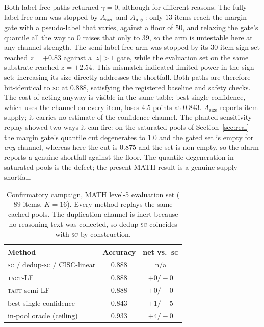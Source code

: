 \documentclass[conference]{IEEEtran}
\newcommand{\SC}{\textsc{sc}}
\newcommand{\TACT}{\textsc{tact}}
\begin{document}
Both label-free paths returned $\gamma=0$, although for different reasons. The fully label-free arm was stopped by
$A_{\mathrm{size}}$ and $A_{\mathrm{mgn}}$: only
$13$ items reach the margin gate with a pseudo-label that varies, against a
floor of $50$, and relaxing the gate's quantile all the way to $0$ raises
that only to $39$, so the arm is untestable here at any channel strength.
The semi-label-free arm was stopped by its $30$-item
sign set reached $z=+0.83$ against a $|z|>1$ gate, while the evaluation set on
the same substrate reached $z=+2.54$. This mismatch indicated limited power in
the sign set; increasing its size directly addresses the shortfall. Both paths are therefore
bit-identical to \SC{} at $0.888$, satisfying the registered baseline and
safety checks. The cost of acting anyway is
visible in the same table: best-single-confidence, which uses the channel on
every item, loses $4.5$ points at $0.843$.
$A_{\mathrm{size}}$ reports item supply; it carries no estimate of the
confidence channel. The planted-sensitivity replay showed two ways it can
fire: on the saturated pools of Section~\ref{sec:real} the
margin gate's quantile cut degenerates to $1.0$ and the gated set is empty for
\emph{any} channel, whereas here the cut is $0.875$ and the set is non-empty,
so the alarm reports a genuine shortfall against the floor. The quantile
degeneration in saturated pools is the defect; the present MATH result is a
genuine supply shortfall.

\begin{table}[t]
\caption{Confirmatory campaign, MATH level-5 evaluation set ($89$ items,
$K{=}16$). Every method replays the same cached pools. The duplication
channel is inert because no reasoning text was collected, so dedup-\SC{}
coincides with \SC{} by construction.}
\label{tab:hard}
\centering\footnotesize
\setlength{\tabcolsep}{4pt}
\begin{tabular}{l c c}
\toprule
Method & Accuracy & net vs.\ \SC \\
\midrule
\SC{} / dedup-\SC{} / CISC-linear & $0.888$ & n/a \\
\TACT-LF & $0.888$ & $+0/-0$ \\
\TACT-semi-LF & $0.888$ & $+0/-0$ \\
best-single-confidence & $0.843$ & $+1/-5$ \\
\midrule
in-pool oracle (ceiling) & $0.933$ & $+4/-0$ \\
\bottomrule
\end{tabular}
\end{table}
\end{document}
